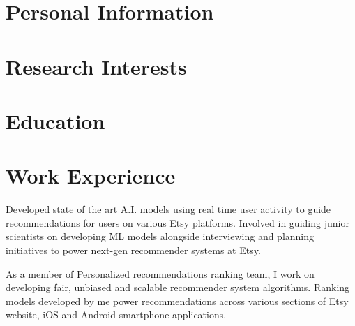 \documentclass[10pt]{moderncv}
\begin{document}
\maketitle

\section{Personal Information}

\section{Research Interests}

\section{Education}

\section{Work Experience}
{
    Developed state of the art A.I. models using real time user activity to guide recommendations for users on various 
        Etsy platforms. 
    Involved in guiding junior scientists on developing ML models alongside interviewing and planning initiatives to 
        power next-gen recommender systems at Etsy.
}

{
    As a member of Personalized recommendations ranking team, I work on developing fair, unbiased and scalable 
        recommender system algorithms.
    Ranking models developed by me power recommendations across various sections of Etsy website, iOS and Android 
        smartphone applications.
}
\end{document}
